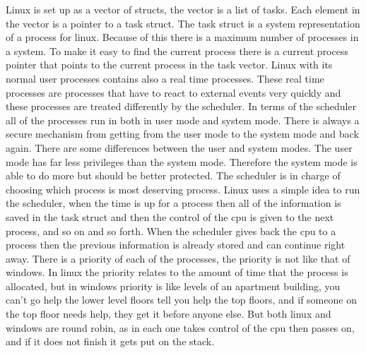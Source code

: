 \documentclass[letterpaper,10pt,draftclsnofoot,onecolumn,titlepage]{IEEEtran}
\begin{document}
Linux is set up as a vector of structs, the vector is a list of tasks. Each element in the vector is a pointer to a task struct. The task struct is a system representation of a process for linux. Because of this there is a maximum number of processes in a system. To make it easy to find the current process there is a current process pointer that points to the current process in the task vector. Linux with its normal user processes contains also a real time processes. These real time processes are processes that have to react to external events very quickly and these processes are treated differently by the scheduler. In terms of the scheduler all of the processes run in both in user mode and system mode. There is always a secure mechanism from getting from the user mode to the system mode and back again. There are some differences between the user and system modes. The user mode has far less privileges than the system mode. Therefore the system mode is able to do more but should be better protected. The scheduler is in charge of choosing which process is most deserving process. Linux uses a simple idea to run the scheduler, when the time is up for a process then all of the information is saved in the task struct and then the control of the cpu is given to the next process, and so on and so forth. When the scheduler gives back the cpu to a process then the previous information is already stored and can continue right away. There is a priority of each of the processes, the priority is not like that of windows. In linux the priority relates to the amount of time that the process is allocated, but in windows priority is like levels of an apartment building, you can't go help the lower level floors tell you help the top floors, and if someone on the top floor needs help, they get it before anyone else. But both linux and windows are round robin, as in each one takes control of the cpu then passes on, and if it does not finish it gets put on the stack.
\end{document}
